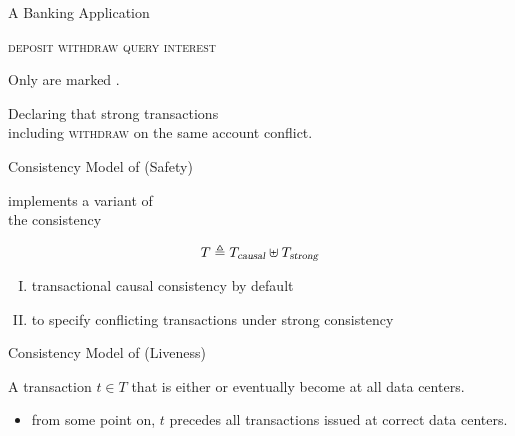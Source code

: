 \begin{frame}{A Banking Application}
  \begin{center}
    \textsc{deposit \quad withdraw \quad query \quad interest}

    \vspace{0.50cm}
    Only  are marked .

    Declaring that strong transactions \\[3pt]
    including \textsc{withdraw} on the same account conflict.
  \end{center}
\end{frame}

\begin{frame}{Consistency Model of \unistore (Safety)}
  \begin{center}
    \unistore{} implements a  variant of \\
    the \por{} consistency

    \pause
    \[
      T \triangleq T_{\textsl{causal}} \uplus T_{\textsl{strong}}
    \]

    \pause
    \vspace{0.60cm}
    \begin{enumerate}[(I)]
      \centering
      \item transactional causal consistency by default
      \item to specify conflicting transactions under strong consistency
    \end{enumerate}
  \end{center}
\end{frame}

\begin{frame}{Consistency Model of \unistore (Liveness)}
  \ev

  \vspace{0.50cm}
  A transaction $t \in T$ that is either 
  or 
  eventually become  at all  data centers.
  \begin{itemize}
    \item from some point on, $t$ precedes all transactions issued
      at correct data centers.
  \end{itemize}
\end{frame}

